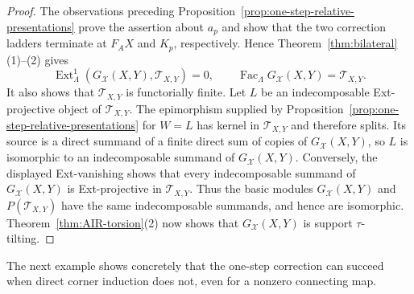 \documentclass[11pt,reqno]{amsart}
\theoremstyle{definition}
\theoremstyle{remark}
\newcommand{\Fac}{\operatorname{Fac}}
\newcommand{\Ext}{\operatorname{Ext}}
\numberwithin{equation}{section}
\begin{document}
\begin{proof}
The observations preceding
Proposition~\ref{prop:one-step-relative-presentations} prove the assertion
about $a_p$ and show that the two correction ladders terminate at $F_AX$ and
$K_p$, respectively.  Hence
Theorem~\ref{thm:bilateral}\textup{(1)}--\textup{(2)}
gives
\[
 \Ext^1_\Lambda(G_{\mathcal X}(X,Y),\mathcal T_{X,Y})=0,
 \qquad
 \Fac_\Lambda G_{\mathcal X}(X,Y)=\mathcal T_{X,Y}.
\]
It also shows that $\mathcal T_{X,Y}$ is functorially finite.
Let $L$ be an indecomposable Ext-projective object of
$\mathcal T_{X,Y}$.  The epimorphism supplied by
Proposition~\ref{prop:one-step-relative-presentations} for $W=L$ has
kernel in $\mathcal T_{X,Y}$ and therefore splits.  Its source is a
direct summand of a finite direct sum of copies of
$G_{\mathcal X}(X,Y)$, so $L$ is isomorphic to an indecomposable summand
of $G_{\mathcal X}(X,Y)$.  Conversely, the displayed Ext-vanishing shows
that every indecomposable summand of $G_{\mathcal X}(X,Y)$ is
Ext-projective in $\mathcal T_{X,Y}$.  Thus the basic modules
$G_{\mathcal X}(X,Y)$ and $P(\mathcal T_{X,Y})$ have the same
indecomposable summands, and hence are isomorphic.
Theorem~\ref{thm:AIR-torsion}\textup{(2)} now shows that
$G_{\mathcal X}(X,Y)$ is support $\tau$-tilting.
\end{proof}

The next example shows concretely that the one-step correction can succeed
when direct corner induction does not, even for a nonzero connecting map.
\end{document}
